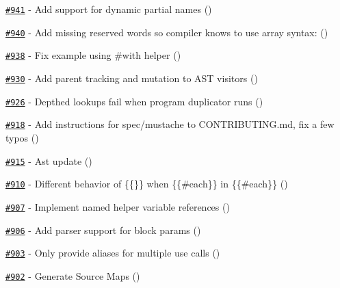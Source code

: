 \begin{DoxyItemize}
\item \href{https://github.com/wycats/handlebars.js/pull/941}{\tt \#941} -\/ Add support for dynamic partial names (\href{https://api.github.com/users/kpdecker}{\tt })
\item \href{https://github.com/wycats/handlebars.js/pull/940}{\tt \#940} -\/ Add missing reserved words so compiler knows to use array syntax\+: (\href{https://api.github.com/users/mattflaschen}{\tt })
\item \href{https://github.com/wycats/handlebars.js/pull/938}{\tt \#938} -\/ Fix example using \#with helper (\href{https://api.github.com/users/diwo}{\tt })
\item \href{https://github.com/wycats/handlebars.js/pull/930}{\tt \#930} -\/ Add parent tracking and mutation to A\+ST visitors (\href{https://api.github.com/users/kpdecker}{\tt })
\item \href{https://github.com/wycats/handlebars.js/issues/926}{\tt \#926} -\/ Depthed lookups fail when program duplicator runs (\href{https://api.github.com/users/kpdecker}{\tt })
\item \href{https://github.com/wycats/handlebars.js/pull/918}{\tt \#918} -\/ Add instructions for \textquotesingle{}spec/mustache\textquotesingle{} to C\+O\+N\+T\+R\+I\+B\+U\+T\+I\+N\+G.\+md, fix a few typos (\href{https://api.github.com/users/oneeman}{\tt })
\item \href{https://github.com/wycats/handlebars.js/pull/915}{\tt \#915} -\/ Ast update (\href{https://api.github.com/users/kpdecker}{\tt })
\item \href{https://github.com/wycats/handlebars.js/issues/910}{\tt \#910} -\/ Different behavior of \{\{\}\} when \{\{\#each\}\} in \{\{\#each\}\} (\href{https://api.github.com/users/zordius}{\tt })
\item \href{https://github.com/wycats/handlebars.js/issues/907}{\tt \#907} -\/ Implement named helper variable references (\href{https://api.github.com/users/kpdecker}{\tt })
\item \href{https://github.com/wycats/handlebars.js/pull/906}{\tt \#906} -\/ Add parser support for block params (\href{https://api.github.com/users/mmun}{\tt })
\item \href{https://github.com/wycats/handlebars.js/issues/903}{\tt \#903} -\/ Only provide aliases for multiple use calls (\href{https://api.github.com/users/kpdecker}{\tt })
\item \href{https://github.com/wycats/handlebars.js/pull/902}{\tt \#902} -\/ Generate Source Maps (\href{https://api.github.com/users/kpdecker}{\tt })

\end{DoxyItemize}
